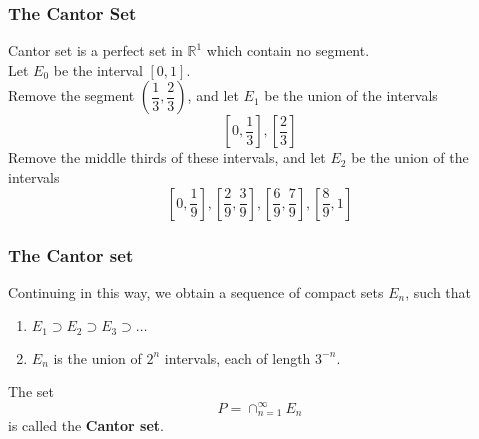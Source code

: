 \documentclass{beamer}
\begin{document}
\begin{frame}
    \frametitle{The Cantor Set}

    Cantor set is a perfect set in \(\mathbb{R}^1\) which contain no segment. \\ \pause 
    \vspace{0.2in}
    Let \(E_0\) be the interval \([0,1]\). \\ \pause
    \vspace{0.2in}
    Remove the segment \(\left(\dfrac{1}{3}, \dfrac{2}{3}\right)\), and let \(E_1\) be the union of the intervals \[\left[0, \dfrac{1}{3}\right], \left[\dfrac{2}{3}\right]\]\pause
    Remove the middle thirds of these intervals, and let \(E_2\) be the union of the intervals \[\left[0, \dfrac{1}{9}\right], \left[\dfrac{2}{9}, \dfrac{3}{9}\right],\left[\dfrac{6}{9}, \dfrac{7}{9}\right],\left[\dfrac{8}{9}, 1\right]\]


\end{frame}

\begin{frame}
    \frametitle{The Cantor set}

    Continuing in this way, we obtain a sequence of compact sets \(E_n\), such that \begin{enumerate}
        \item \(E_1 \supset E_2 \supset E_3 \supset \dots\)
        \item \(E_n\) is the union of \(2^n\) intervals, each of length \(3^{-n}\).
    \end{enumerate}
The set \[P = \cap_{n=1}^\infty E_n\] is called the \textbf{Cantor set}.
\end{frame}
\end{document}
